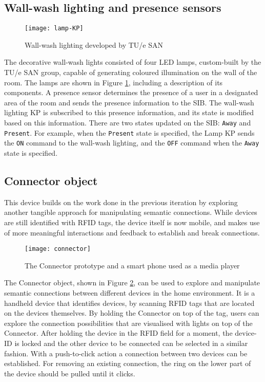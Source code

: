 \subsection{Wall-wash lighting and presence sensors}

\begin{figure}
\centering
\texttt{[image: lamp-KP]}
\caption{Wall-wash lighting developed by TU/e SAN}
\label{wallwash}
\end{figure}

The decorative wall-wash lights consisted of four LED lamps, custom-built by the TU/e \ac{SAN} group, capable of generating coloured illumination on the wall of the room. The lamps are shown in Figure \ref{wallwash}, including a description of its components. A presence sensor determines the presence of a user in a designated area of the room and sends the presence information to the \ac{SIB}. The wall-wash lighting \ac{KP} is subscribed to this presence information, and its state is modified based on this information. There are two states updated on the \ac{SIB}: \texttt{Away} and \texttt{Present}. For example, when the \texttt{Present} state is specified, the Lamp \ac{KP} sends  the \texttt{ON} command to the wall-wash lighting, and the \texttt{OFF} command when the \texttt{Away} state is specified.  


\subsection{Connector object}
\label{Connector}
This device builds on the work done in the previous iteration by exploring another tangible approach for manipulating semantic connections. While devices are still identified with \ac{RFID} tags, the device itself is now mobile, and makes use of more meaningful interactions and feedback to establish and break connections.

\begin{figure}
\centering
\texttt{[image: connector]}
\caption{The Connector prototype and a smart phone used as a media player}
\label{connector}
\end{figure}

The Connector object, shown in Figure \ref{connector}, can be used to explore and manipulate semantic connections between different devices in the home environment. It is a handheld device that identifies devices, by scanning \ac{RFID} tags that are located on the devices themselves. By holding the Connector on top of the tag, users can explore the connection possibilities that are visualised with lights on top of the Connector. After holding the device in the \ac{RFID} field for a moment, the device-ID is locked and the other device to be connected can be selected in a similar fashion. With a push-to-click action a connection between two devices can be established. For removing an existing connection, the ring on the lower part of the device should be pulled until it clicks.

